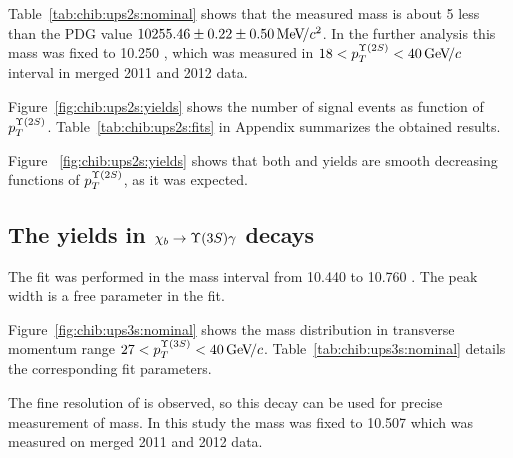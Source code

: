 


Table~\ref{tab:chib:ups2s:nominal} shows that the measured \chiboneTwoP mass is
about 5 \mevcc less than the PDG value $10255.46  \pm 0.22 \pm 0.50 {\mathrm{\,Me\kern -0.1em V\!/}c^2}$. In
the further analysis this mass was fixed to 10.250 \gevcc, which
was measured in $18 < p_T^{\Y2S} < 40 \gevc$ interval in merged 2011 and
2012 data.

Figure~\ref{fig:chib:ups2s:yields} shows the number of signal events as function
of $p_T^{\Y2S}$. Table~\ref{tab:chib:ups2s:fits} in Appendix summarizes the
obtained results.



Figure ~\ref{fig:chib:ups2s:yields} shows that both \chibTwoP and
\chibThreeP yields are smooth decreasing functions of $p_T^{\Y2S}$, as it was
expected.



\subsection{The \texorpdfstring{\chib}{chib} yields in
	\texorpdfstring{$\chib \to \Y3S \gamma$}{chib --> Y(3S) gamma} decays}
\label{sec:chib:ups3s:fit}

The fit was performed in the mass interval from  10.440 to 10.760 \gevcc. The
\chiboneThreeP peak width is a free parameter in the fit.

Figure~\ref{fig:chib:ups3s:nominal} shows the mass distribution in transverse
momentum range $27<p_T^{\Y3S}<40\gevc$. Table~\ref{tab:chib:ups3s:nominal}
details the corresponding fit parameters.




The fine resolution of \chiboneThreeP is observed, so this decay can be used
for precise measurement of \chiboneThreeP mass. In this study the mass 
was fixed to 10.507 \gevcc which was measured on merged 2011 and 2012 data.

